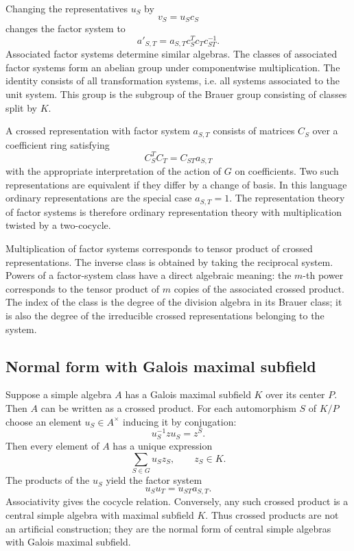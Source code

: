 \documentclass[12pt]{article}
\begin{document}
Changing the representatives \(u_S\) by
\[
  v_S=u_Sc_S
\]
changes the factor system to
\[
  a'_{S,T}=a_{S,T}c_S^Tc_Tc_{ST}^{-1}.
\]
Associated factor systems determine similar algebras. The classes of associated factor systems form an abelian group under componentwise multiplication. The identity consists of all transformation systems, i.e. all systems associated to the unit system. This group is the subgroup of the Brauer group consisting of classes split by \(K\).

A crossed representation with factor system \(a_{S,T}\) consists of matrices \(C_S\) over a coefficient ring satisfying
\[
  C_S^T C_T=C_{ST}a_{S,T}
\]
with the appropriate interpretation of the action of \(G\) on coefficients. Two such representations are equivalent if they differ by a change of basis. In this language ordinary representations are the special case \(a_{S,T}=1\). The representation theory of factor systems is therefore ordinary representation theory with multiplication twisted by a two-cocycle.

Multiplication of factor systems corresponds to tensor product of crossed representations. The inverse class is obtained by taking the reciprocal system. Powers of a factor-system class have a direct algebraic meaning: the \(m\)-th power corresponds to the tensor product of \(m\) copies of the associated crossed product. The index of the class is the degree of the division algebra in its Brauer class; it is also the degree of the irreducible crossed representations belonging to the system.

\subsection{Normal form with Galois maximal subfield}

Suppose a simple algebra \(A\) has a Galois maximal subfield \(K\) over its center \(P\). Then \(A\) can be written as a crossed product. For each automorphism \(S\) of \(K/P\) choose an element \(u_S\in A^{\times}\) inducing it by conjugation:
\[
  u_S^{-1}zu_S=z^S.
\]
Then every element of \(A\) has a unique expression
\[
  \sum_{S
\in G} u_S z_S,
  \qquad z_S\in K.
\]
The products of the \(u_S\) yield the factor system
\[
  u_Su_T=u_{ST}a_{S,T}.
\]
Associativity gives the cocycle relation. Conversely, any such crossed product is a central simple algebra with maximal subfield \(K\). Thus crossed products are not an artificial construction; they are the normal form of central simple algebras with Galois maximal subfield.
\end{document}
